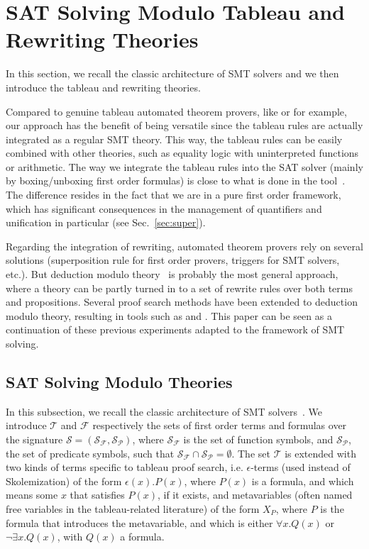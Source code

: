 
\section{SAT Solving Modulo Tableau and Rewriting Theories}
\label{sec:smt}

In this section, we recall the classic architecture of SMT solvers and we then
introduce the tableau and rewriting theories.

Compared to genuine tableau automated theorem provers, like \princess{} or
\zenon{} for example, our approach has the benefit of being versatile since the
tableau rules are actually integrated as a regular SMT theory. This way, the
tableau rules can be easily combined with other theories, such as equality logic
with uninterpreted functions or arithmetic. The way we integrate the tableau
rules into the SAT solver (mainly by boxing/unboxing first order formulas) is
close to what is done in the \satallax{} tool~\cite{CEB12}. The difference
resides in the fact that we are in a pure first order framework, which has
significant consequences in the management of quantifiers and unification in
particular (see Sec.~\ref{sec:super}).

Regarding the integration of rewriting, automated theorem provers rely on
several solutions (superposition rule for first order provers, triggers for SMT
solvers, etc.). But deduction modulo theory~\cite{DA03} is probably the most
general approach, where a theory can be partly turned in to a set of rewrite
rules over both terms and propositions. Several proof search methods have been
extended to deduction modulo theory, resulting in tools such as \iproverm{} and
\zenm{}. This paper can be seen as a continuation of these previous experiments
adapted to the framework of SMT solving.

\subsection{SAT Solving Modulo Theories}

In this subsection, we recall the classic architecture of SMT
solvers~\cite{BEA06}. We introduce $\mathcal{T}$ and $\mathcal{F}$ respectively
the sets of first order terms and formulas over the signature
$\mathcal{S}=(\mathcal{S}_\mathcal{F},\mathcal{S}_\mathcal{P})$, where
$\mathcal{S}_\mathcal{F}$ is the set of function symbols, and
$\mathcal{S}_\mathcal{P}$, the set of predicate symbols, such that
$\mathcal{S}_\mathcal{F}\cap\mathcal{S}_\mathcal{P}=\emptyset$. The set
$\mathcal{T}$ is extended with two kinds of terms specific to tableau proof
search, i.e. $\epsilon{}$-terms (used instead of Skolemization) of the form
$\epsilon(x).P(x)$, where $P(x)$ is a formula, and which means some $x$ that
satisfies $P(x)$, if it exists, and metavariables (often named free variables in
the tableau-related literature) of the form $X_P$, where $P$ is the formula that
introduces the metavariable, and which is either $\forall{}x.Q(x)$ or
$\neg\exists{}x.Q(x)$, with $Q(x)$ a formula.

